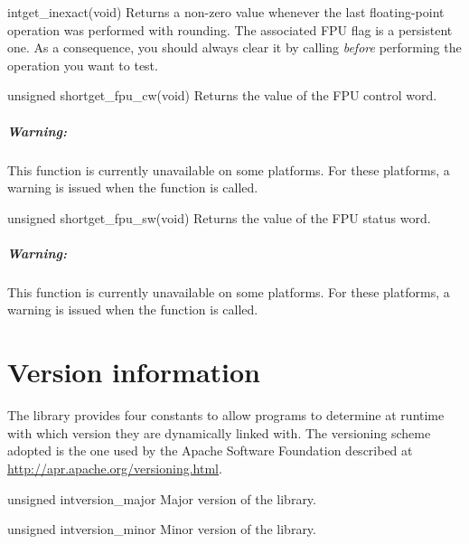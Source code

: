 \documentclass{manual}
\begin{document}
\begin{deffun}{int}{get\_inexact}{(void)}
Returns a non-zero value whenever the last floating-point operation was performed
with rounding. The associated FPU flag is a persistent one. As a consequence,
you should always clear it by calling 
\emph{before} performing the operation you want to test.
\end{deffun}

\begin{deffun}{unsigned short}{get\_fpu\_cw}{(void)}
  Returns the value of the FPU control word.

\paragraph{Warning:} This function is currently unavailable on some platforms.
For these platforms, a warning is issued when the function is called.
\end{deffun}

\begin{deffun}{unsigned short}{get\_fpu\_sw}{(void)}
Returns the value of the FPU status word.

\paragraph{Warning:} This function is currently unavailable on some platforms.
For these platforms, a warning is issued when the function is called.
\end{deffun}

\chapter{Version information}

The library provides four constants to allow programs to determine at runtime with which version
they are dynamically linked with. The versioning scheme adopted is the one used by the Apache
Software Foundation described at \url{http://apr.apache.org/versioning.html}.

\begin{defconst}{unsigned int}{version\_major}
  Major version of the library.
\end{defconst}

\begin{defconst}{unsigned int}{version\_minor}
  Minor version of the library.
\end{defconst}
\end{document}
